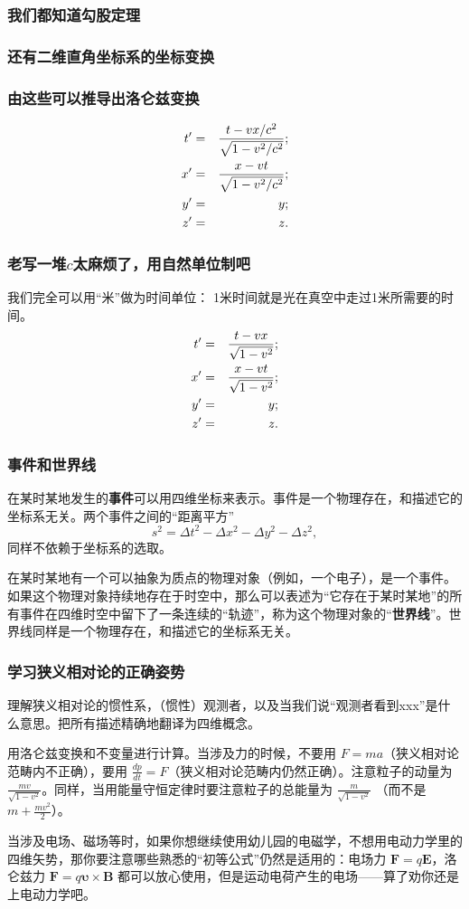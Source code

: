 \documentclass[CJK,13pt]{beamer}
\date{}
\begin{document}
  \bch
{}


\begin{frame}
  \frametitle{我们都知道勾股定理}
\end{frame}


\begin{frame}
  \frametitle{还有二维直角坐标系的坐标变换}
\end{frame}


\begin{frame}
  \frametitle{由这些可以推导出洛仑兹变换}
  \begin{eqnarray}
  t'&=&\frac{t-vx/c^2}{\sqrt{1-v^2/c^2}}; \nonumber \\
  x'&=&\frac{x-vt}{\sqrt{1-v^2/c^2}}; \nonumber \\
  y'&=&y; \nonumber \\
  z'&=&z. \nonumber
  \end{eqnarray}
\end{frame}


\begin{frame}
  \frametitle{老写一堆$c$太麻烦了，用自然单位制吧}
  我们完全可以用``米''做为时间单位： 1米时间就是光在真空中走过1米所需要的时间。
  \begin{eqnarray}
  t'&=&\frac{t-vx}{\sqrt{1-v^2}}; \nonumber \\
  x'&=&\frac{x-vt}{\sqrt{1-v^2}}; \nonumber \\
  y'&=&y; \nonumber \\
  z'&=&z. \nonumber
  \end{eqnarray}
\end{frame}

\begin{frame}
  \frametitle{事件和世界线}
  \bitem
  \item{在某时某地发生的{\bf 事件}可以用四维坐标来表示。事件是一个物理存在，和描述它的坐标系无关。两个事件之间的``距离平方'' $$s^2=\Delta t^2 - \Delta x^2 - \Delta y^2 - \Delta z^2,$$同样不依赖于坐标系的选取。}
  \item{在某时某地有一个可以抽象为质点的物理对象（例如，一个电子），是一个事件。如果这个物理对象持续地存在于时空中，那么可以表述为``它存在于某时某地''的所有事件在四维时空中留下了一条连续的“轨迹”，称为这个物理对象的“{\bf 世界线}”。世界线同样是一个物理存在，和描述它的坐标系无关。}
    \eitem
\end{frame}




\begin{frame}
  \frametitle{学习狭义相对论的正确姿势}
  \bitem
\item{理解狭义相对论的惯性系，（惯性）观测者，以及当我们说“观测者看到xxx”是什么意思。把所有描述精确地翻译为四维概念。}
\item{用洛仑兹变换和不变量进行计算。当涉及力的时候，不要用  $F=ma$（狭义相对论范畴内不正确），要用 $\frac{dp}{dt} = F$（狭义相对论范畴内仍然正确）。注意粒子的动量为
  $\frac{mv}{\sqrt{1-v^2}}$。同样，当用能量守恒定律时要注意粒子的总能量为 $\frac{m}{\sqrt{1-v^2}}$ （而不是 $m+\frac{mv^2}{2}$）。}
\item{当涉及电场、磁场等时，如果你想继续使用幼儿园的电磁学，不想用电动力学里的四维矢势，那你要注意哪些熟悉的“初等公式”仍然是适用的：电场力 $\mathbf{F}=q\mathbf{E}$，洛仑兹力
$\mathbf{F} = q\mathbf{\upsilon}\times \mathbf{B}$ 都可以放心使用，但是运动电荷产生的电场——算了劝你还是上电动力学吧。}
  \eitem

\end{frame}
\end{document}
